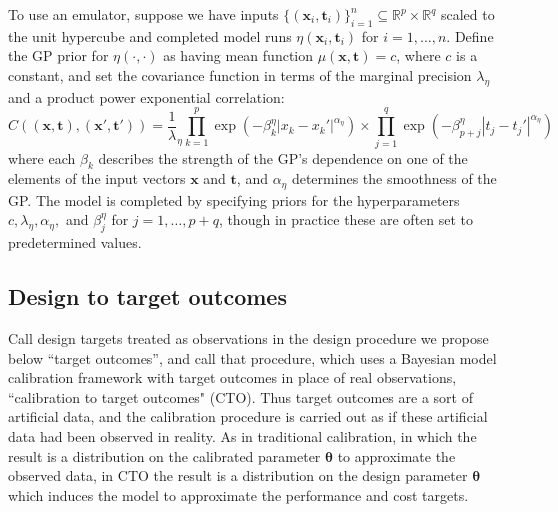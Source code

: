 \documentclass[12pt]{article}
\begin{document}
%
To use an emulator, suppose we have inputs $\{(\mathbf x_i,\mathbf t_i)\}_{i=1}^n\subseteq \mathbb R^p\times \mathbb R^q$ scaled to the
unit hypercube and completed model runs
%
$\eta\left(\mathbf x_i,\mathbf t_i\right)$ for $i=1,\ldots,n.$
%
Define the GP prior for $\eta(\cdot,\cdot)$ as having mean function $\mu(\mathbf x,\mathbf t)=c$, where $c$ is a constant, and
%
set the covariance function in terms of the marginal precision $\lambda_\eta$ and a product power exponential correlation:
%
\begin{equation}\label{eq:Hig_cov}
C((\mathbf x,\mathbf t),(\mathbf x',\mathbf t')) = \frac 1\lambda_\eta \prod_{k=1}^{p}
\exp \left(-\beta^\eta_k|x_k-x_k'|^{\alpha_\eta}\right) \times
\prod_{j=1}^{q}
\exp \left(-\beta^\eta_{p+j}|t_j-t_j'|^{\alpha_\eta}\right)
\end{equation}
%
where each $\beta_k$ describes the strength of the GP's dependence on one of the elements of the input vectors $\mathbf x$ and $\mathbf t$, and $\alpha_\eta$ determines the smoothness of the GP.
%
The model is completed by specifying priors for the hyperparameters $c,\lambda_\eta,\alpha_\eta,$ and $\beta^\eta_j$ for $j=1,\ldots,p+q$, though in practice these are often set to predetermined values.
%

%
\subsection{Design to target outcomes}
%

%
Call design targets treated as observations in the design procedure we propose below ``target outcomes'', and call that procedure, which uses a Bayesian model calibration framework with target outcomes in place of real observations, ``calibration to target outcomes" (CTO).
%
Thus target outcomes are a sort of artificial data, and the calibration procedure is carried out as if these artificial data had been observed in reality.
%
As in traditional calibration, in which the result is a distribution on the calibrated parameter $\boldsymbol\theta$ to approximate the observed data, in CTO the result is a distribution on the design parameter $\boldsymbol\theta$ which induces the model to approximate the performance and cost targets.
%
%
%
%
%
\end{document}
